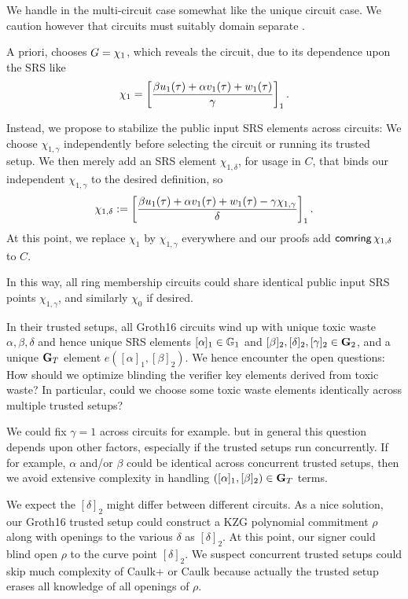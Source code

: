 We handle \comring in the multi-circuit case somewhat like the
unique circuit case.  We caution however that circuits must suitably domain
separate \comring.

\smallskip

A priori, \pifast chooses $G = \chi_1$, which reveals the circuit,
due to its dependence upon the SRS like
$$ \chi_1 = \left[ {\beta u_1(\tau) + \alpha v_1(\tau) + w_1(\tau) \over \gamma} \right]_1 . $$

Instead, we propose to stabilize the public input SRS elements across circuits:
We choose $\chi_{1,\gamma}$ independently before selecting the circuit
or running its trusted setup.
We then merely add an SRS element $\chi_{1,\delta}$, for usage in $C$, that binds
our independent $\chi_{1,\gamma}$ to the desired definition, so
$$ \chi_{1,\delta} := \left[ {\beta u_1(\tau) + \alpha v_1(\tau) + w_1(\tau) - \gamma \chi_{1,\gamma} \over \delta} \right]_1 . $$
At this point, we replace $\chi_1$ by $\chi_{1,\gamma}$ everywhere and
our proofs add $\mathsf{comring} \, \chi_{1,\delta}$ to $C$.

In this way, all ring membership circuits could share identical
public input SRS points $\chi_{1,\gamma}$, and similarly $\chi_0$ if desired.

\smallskip

In their trusted setups, all Groth16 circuits wind up with unique
toxic waste $\alpha,\beta,\delta$ and hence unique SRS elements
$[\alpha]_1 \in {\mathbb{G}}_1$ and $[\beta]_2, [\delta]_2, [\gamma]_2 \in {\mathbf{G}}_2$,
and a unique ${\mathbf{G}}_T$ element $e([\alpha]_1, [\beta]_2)$.
We hence encounter the open questions:
How should we optimize blinding the verifier key elements derived from toxic waste?
In particular, could we choose some toxic waste elements identically across multiple trusted setups?

We could fix $\gamma=1$ across circuits for example. but in general
this question depends upon other factors, especially if the trusted setups
run concurrently.
If for example, $\alpha$ and/or $\beta$ could be identical across
concurrent trusted setups, then we avoid extensive complexity in
 handling $([\alpha]_1, [\beta]_2) \in {\mathbf{G}}_T$ terms.

We expect the $[\delta]_2$ might differ between different circuits.
As a nice solution, our Groth16 trusted setup could construct a
KZG polynomial commitment $\rho$ along with openings to the
various $\delta$ as $[\delta]_2$.  At this point, our signer could
blind open $\rho$ to the curve point $[\delta]_2$.
We suspect concurrent trusted setups could skip much complexity of
Caulk+ \cite{caulk+} or Caulk \cite{caulk} because actually the
 trusted setup erases all knowledge of all openings of $\rho$.

\endinput



\subsection{Post-quantum}





\subsection{SnarkPack}

TODO: Handle $\pi$ hashes?


